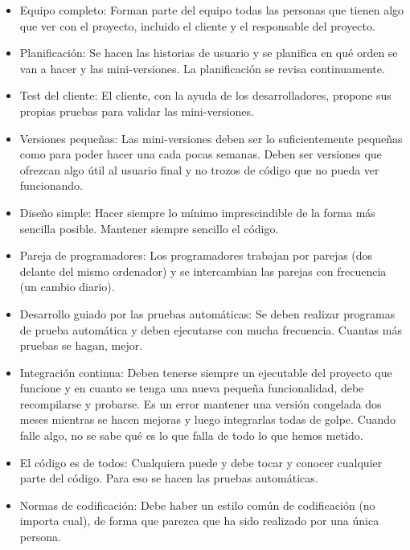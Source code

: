 \begin{itemize}

    \item Equipo completo: Forman parte del equipo todas las personas que tienen algo que ver con el proyecto, incluido el cliente y el responsable del proyecto. 

	\item Planificación: Se hacen las historias de usuario y se planifica en qué orden se van a hacer y las mini-versiones. La planificación se revisa continuamente. 
	
	\item Test del cliente: El cliente, con la ayuda de los desarrolladores, propone sus propias pruebas para validar las mini-versiones. 

	\item Versiones pequeñas: Las mini-versiones deben ser lo suficientemente pequeñas como para poder hacer una cada pocas semanas. Deben ser versiones que ofrezcan algo útil al usuario final y no trozos de código que no pueda ver funcionando. 

	\item Diseño simple: Hacer siempre lo mínimo imprescindible de la forma más sencilla posible. Mantener siempre sencillo el código. 

	\item Pareja de programadores: Los programadores trabajan por parejas (dos delante del mismo ordenador) y se intercambian las parejas con frecuencia (un cambio diario). 

	\item Desarrollo guiado por las pruebas automáticas: Se deben realizar programas de prueba automática y deben ejecutarse con mucha frecuencia. Cuantas más pruebas se hagan, mejor. 

	\item Integración continua: Deben tenerse siempre un ejecutable del proyecto que funcione y en cuanto se tenga una nueva pequeña funcionalidad, debe recompilarse y probarse. Es un error mantener una versión congelada dos meses mientras se hacen mejoras y luego integrarlas todas de golpe. Cuando falle algo, no se sabe qué es lo que falla de todo lo que hemos metido. 

	\item El código es de todos: Cualquiera puede y debe tocar y conocer cualquier parte del código. Para eso se hacen las pruebas automáticas. 

	\item Normas de codificación: Debe haber un estilo común de codificación (no importa cual), de forma que parezca que ha sido realizado por una única persona. 


\end{itemize}
